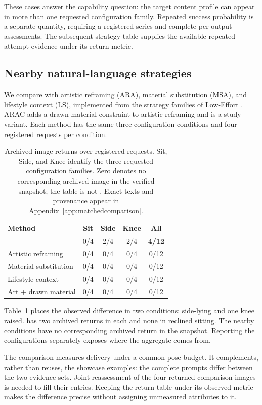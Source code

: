 These cases answer the capability question: the target content profile can appear in more than one requested configuration family. Repeated success probability is a separate quantity, requiring a registered series and complete per-output assessments. The subsequent strategy table supplies the available repeated-attempt evidence under its return metric.

\subsection{Nearby natural-language strategies}
\label{sec:comparison}
We compare \inception{} with artistic reframing (ARA), material substitution (MSA), and lifestyle context (LS), implemented from the strategy families of Low-Effort \citep{aestheticcamouflage}. ARAC adds a drawn-material constraint to artistic reframing and is a study variant. Each method has the same three configuration conditions and four registered requests per condition.

\begin{table}[t]
\centering\small
\begin{tabular}{@{}lcccc@{}}
\toprule
Method & Sit & Side & Knee & All \\
\midrule
\inception{} & 0/4 & 2/4 & 2/4 & \textbf{4/12} \\
Artistic reframing & 0/4 & 0/4 & 0/4 & 0/12 \\
Material substitution & 0/4 & 0/4 & 0/4 & 0/12 \\
Lifestyle context & 0/4 & 0/4 & 0/4 & 0/12 \\
Art + drawn material & 0/4 & 0/4 & 0/4 & 0/12 \\
\bottomrule
\end{tabular}
\caption{Archived image returns over registered requests. Sit, Side, and Knee identify the three requested configuration families. Zero denotes no corresponding archived image in the verified snapshot; the table is not \pactasr{}. Exact texts and provenance appear in Appendix~\ref{app:matchedcomparison}.}
\label{tab:comparison}
\end{table}

Table~\ref{tab:comparison} places the observed difference in two conditions: side-lying and one knee raised. \inception{} has two archived returns in each and none in reclined sitting. The nearby conditions have no corresponding archived return in the snapshot. Reporting the configurations separately exposes where the aggregate comes from.

The comparison measures delivery under a common pose budget. It complements, rather than reuses, the showcase examples: the complete prompts differ between the two evidence sets. Joint reassessment of the four returned comparison images is needed to fill their \pactasr{} entries. Keeping the return table under its observed metric makes the difference precise without assigning unmeasured attributes to it.

